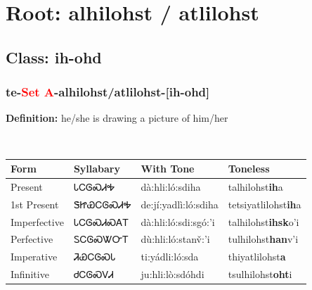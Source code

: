 \needspace{4in}
\section*{Root: alhilohst / atlilohst}
\nopagebreak
{}
\needspace{3in}
\subsection*{Class: ih-ohd}
\nopagebreak
\needspace{2in}
\subsubsection*{te{-}\textcolor{Red}{Set A}{-}\textbf{alhilohst/atlilohst}{-}[ih-ohd]}
\nopagebreak
\textbf{Definition: } he/she is drawing a picture of him/her
\\[0.5em]
\begin{tabularx}{\textwidth}{l X X X}%
\toprule%
\textbf{Form}&\textbf{Syllabary}&\textbf{With Tone}&\textbf{Toneless}\\%
\midrule%
Present&ᏓᏟᎶᏍᏗᎭ&dà:hli:ló:sdiha&talhilohst\textbf{ih}a\\%
1st Present&ᏕᏥᏯᏟᎶᏍᏗᎭ&de:jí:yadlì:ló:sdiha&tetsiyatlilohst\textbf{ih}a\\%
Imperfective&ᏓᏟᎶᏍᏗᏍᎪᎢ&dà:hli:ló:sdi:sgó:’i&talhilohst\textbf{ihsk}o'i\\%
Perfective&ᏚᏟᎶᏍᏔᏅᎢ&dù:hli:ló:stanv̌:’i&tulhilohst\textbf{han}v'i\\%
Imperative&ᏘᏯᏟᎶᏍᏓ&ti:yádli:ló:sda&thiyatlilohst\textbf{a}\\%
Infinitive&ᏧᏟᎶᏍᏙᏗ&ju:hli:lò:sdóhdi&tsulhilohst\textbf{oht}i\\%
\bottomrule%
\end{tabularx}
\\[1em]